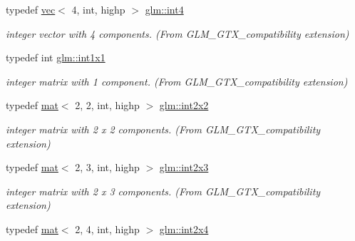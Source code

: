 \begin{DoxyCompactItemize}
\mbox{\label{group__gtx__compatibility_ga19f0c43f626567ad3ca888b8ad0d0093}} 
typedef \hyperlink{structglm_1_1vec}{vec}$<$ 4, int, highp $>$ \hyperlink{group__gtx__compatibility_ga19f0c43f626567ad3ca888b8ad0d0093}{glm\+::int4}
\begin{DoxyCompactList}\small\item\em integer vector with 4 components. (From G\+L\+M\+\_\+\+G\+T\+X\+\_\+compatibility extension) \end{DoxyCompactList}\item 
\mbox{\label{group__gtx__compatibility_ga09016a637a3cd093c22e6188080ac750}} 
typedef int \hyperlink{group__gtx__compatibility_ga09016a637a3cd093c22e6188080ac750}{glm\+::int1x1}
\begin{DoxyCompactList}\small\item\em integer matrix with 1 component. (From G\+L\+M\+\_\+\+G\+T\+X\+\_\+compatibility extension) \end{DoxyCompactList}\item 
\mbox{\label{group__gtx__compatibility_ga8884c82366cc406dd20e00b78969d001}} 
typedef \hyperlink{structglm_1_1mat}{mat}$<$ 2, 2, int, highp $>$ \hyperlink{group__gtx__compatibility_ga8884c82366cc406dd20e00b78969d001}{glm\+::int2x2}
\begin{DoxyCompactList}\small\item\em integer matrix with 2 x 2 components. (From G\+L\+M\+\_\+\+G\+T\+X\+\_\+compatibility extension) \end{DoxyCompactList}\item 
\mbox{\label{group__gtx__compatibility_ga13c7e3ba6d19765d8877cccf05c2e520}} 
typedef \hyperlink{structglm_1_1mat}{mat}$<$ 2, 3, int, highp $>$ \hyperlink{group__gtx__compatibility_ga13c7e3ba6d19765d8877cccf05c2e520}{glm\+::int2x3}
\begin{DoxyCompactList}\small\item\em integer matrix with 2 x 3 components. (From G\+L\+M\+\_\+\+G\+T\+X\+\_\+compatibility extension) \end{DoxyCompactList}\item 
\mbox{\label{group__gtx__compatibility_gab5fea62bdc861a2b0dd5ae6147b88975}} 
typedef \hyperlink{structglm_1_1mat}{mat}$<$ 2, 4, int, highp $>$ \hyperlink{group__gtx__compatibility_gab5fea62bdc861a2b0dd5ae6147b88975}{glm\+::int2x4}

\end{DoxyCompactItemize}

